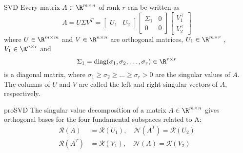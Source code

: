 \begin{theo}{SVD}
    Every matrix $A \in \R^{m \times n}$ of rank $r$ can be written as
    \begin{equation*}
        A = U \Sigma V^T = \left[
            \begin{array}{cc}
            U_1 & U_2
            \end{array}
            \right]
            \left[
            \begin{array}{cc}
            \Sigma_1 & 0 \\
            0 & 0
            \end{array}
            \right]
            \left[
            \begin{array}{c}
            V_1^\top \\
            V_2^\top
            \end{array}
            \right]
    \end{equation*}
    where $U \in \R^{m \times m}$ and $V \in \R^{n \times n}$ are orthogonal matrices, $U_1 \in \R^{m \times r}$ , $V_1 \in \R^{n \times r}$ and 
    \begin{equation*}
        \Sigma_1 = \text{diag}(\sigma_1, \sigma_2, \ldots, \sigma_r) \in \R^{r \times r}
    \end{equation*}
    is a diagonal matrix, where $\sigma_1 \geq \sigma_2 \geq \ldots \geq \sigma_r > 0$ are the singular values of $A$. The columns of $U$ and $V$ are called the left and right singular vectors of $A$, respectively.
\end{theo}

\begin{pro}{proSVD}
    The singular value decomposition of a matrix $A \in \R^{m \times n}$ gives orthogonal bases for the four fundamental subspaces related to A:
    \begin{align*}
        \mathcal{R}(A) &= \mathcal{R}(U_1), \quad \mathcal{N}(A^T) = \mathcal{R}(U_2) \\
        \mathcal{R}(A^T) &= \mathcal{R}(V_1), \quad \mathcal{N}(A) = \mathcal{R}(V_2) \\
    \end{align*}
    \vspace{-1cm}
\end{pro}

\newpage

